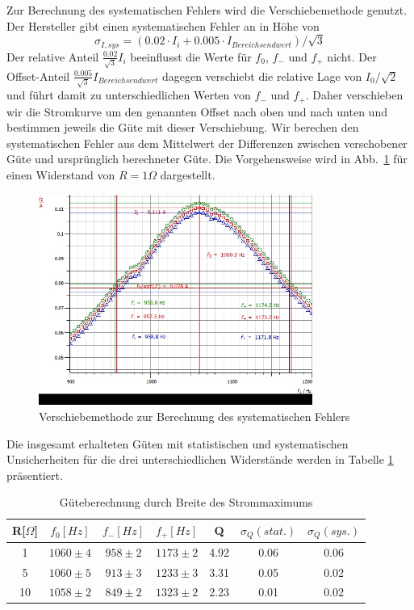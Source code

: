\documentclass[12pt,a4paper]{article}
\begin{document}
Zur Berechnung des systematischen Fehlers wird die Verschiebemethode genutzt. Der Hersteller gibt einen systematischen Fehler an in Höhe von
\begin{equation}
\sigma_{I,sys}=(0.02\cdot I_i+0.005\cdot I_{Bereichsendwert})/\sqrt{3}
\end{equation}
Der relative Anteil $\frac{0.02}{\sqrt{3}}I_i$ beeinflusst die Werte für $f_0$, $f_-$ und $f_+$ nicht. Der Offset-Anteil $\frac{0.005}{\sqrt{3}}I_{Bereichsendwert}$ dagegen verschiebt die relative Lage von $I_0/\sqrt{2}$ und führt damit zu unterschiedlichen Werten von $f_-$ und $f_+$. Daher verschieben wir die Stromkurve um den genannten Offset nach oben und nach unten und bestimmen jeweils die Güte mit dieser Verschiebung. Wir berechen den systematischen Fehler aus dem Mittelwert der Differenzen zwischen verschobener Güte und ursprünglich berechneter Güte. Die Vorgehensweise wird in Abb.~\ref{S1Ohm_f0_sys} für einen Widerstand von $R=1\Omega$ dargestellt.
\begin{figure}[H]
	\centering
	\includegraphics[width=0.8\textwidth]{Daten/S1_f0_sys.jpg}
	\caption{Verschiebemethode zur Berechnung des systematischen Fehlers}
	\label{S1Ohm_f0_sys}
\end{figure}
Die insgesamt erhalteten Güten mit statistischen und systematischen Unsicherheiten für die drei unterschiedlichen Widerstände werden in Tabelle \ref{table:S_f0} präsentiert.
\begin{table}[H]
	\centering
	\begin{tabular}{|c|c|c|c|c|c|c|}
		\hline
		R[$\Omega$]&$f_0[Hz]$&$f_-[Hz]$&$f_+[Hz]$&Q&$\sigma_Q(stat.)$&$\sigma_Q(sys.)$\\
		\hline
		1&$1060\pm4$&$958\pm2$&$1173\pm2$&4.92&0.06&0.06\\
		5&$1060\pm5$&$913\pm3$&$1233\pm3$&3.31&0.05&0.02\\
		10&$1058\pm2$&$849\pm2$&$1323\pm2$&2.23&0.01&0.02\\
		\hline		
	\end{tabular}
	\caption{Güteberechnung durch Breite des Strommaximums}
	\label{table:S_f0}
\end{table}
\end{document}
